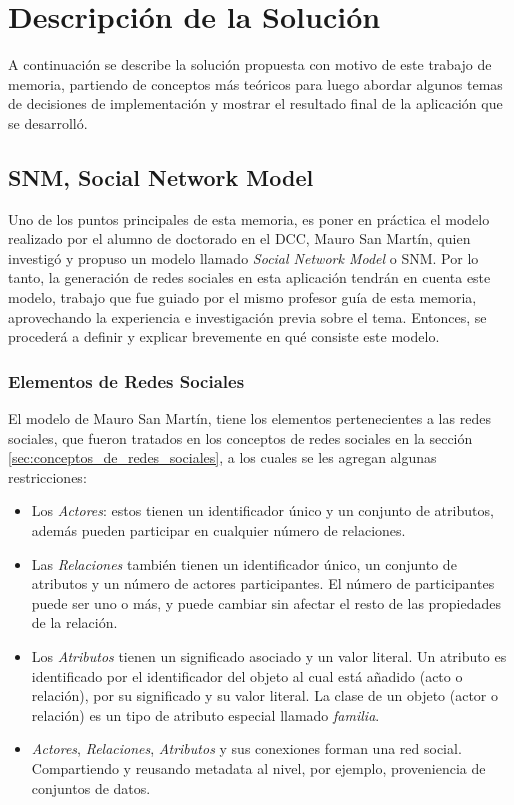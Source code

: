 \chapter{Descripción de la Solución}
\label{chap:descripcion_solucion}

A continuación se describe la solución propuesta con motivo de este trabajo de memoria, partiendo de conceptos más teóricos para luego abordar algunos temas de decisiones de implementación y mostrar el resultado final de la aplicación que se desarrolló.

\section{SNM, Social Network Model} %
\label{sec:snm_social_network_model}

Uno de los puntos principales de esta memoria, es poner en práctica el modelo realizado por el alumno de doctorado en el DCC, Mauro San Martín\cite{tesismauro}, quien investigó y propuso un modelo llamado \emph{Social Network Model} o SNM. Por lo tanto, la generación de redes sociales en esta aplicación tendrán en cuenta este modelo, trabajo que fue guiado por el mismo profesor guía de esta memoria, aprovechando la experiencia e investigación previa sobre el tema. Entonces, se procederá a definir y explicar brevemente en qué consiste este modelo.

\subsection{Elementos de Redes Sociales} %
\label{sub:elementos_de_redes_sociales}

El modelo de Mauro San Martín, tiene los elementos pertenecientes a las redes sociales, que fueron tratados en los conceptos de redes sociales en la sección \ref{sec:conceptos_de_redes_sociales}, a los cuales se les agregan algunas restricciones:

  \begin{itemize}
    \item Los \emph{Actores}: estos tienen un identificador único y un conjunto de atributos, además pueden participar en cualquier número de relaciones.
    \item Las \emph{Relaciones} también tienen un identificador único, un conjunto de atributos y un número de actores participantes. El número de participantes puede ser uno o más, y puede cambiar sin afectar el resto de las propiedades de la relación.
    \item Los \emph{Atributos} tienen un significado asociado y un valor literal. Un atributo es identificado por el identificador del objeto al cual está añadido (acto o relación), por su significado y su valor literal. La clase de un objeto (actor o relación) es un tipo de atributo especial llamado \emph{familia}.
    \item \emph{Actores}, \emph{Relaciones}, \emph{Atributos} y sus conexiones forman una red social. Compartiendo y reusando metadata al nivel, por ejemplo, proveniencia de conjuntos de datos.
  \end{itemize}
  
